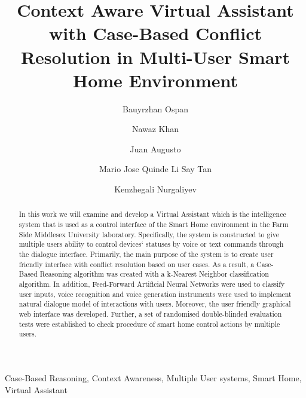 \documentclass{llncs}
\begin{document}
    \title{Context Aware Virtual Assistant with
    Case-Based Conflict Resolution in
    Multi-User Smart Home Environment}
    \author{Bauyrzhan Ospan \and Nawaz Khan  \and Juan Augusto  \and Mario Jose Quinde Li Say Tan  \and Kenzhegali Nurgaliyev }
    \maketitle
    \begin{abstract}
        In this work we will examine and develop a Virtual Assistant which is the intelligence system that is used as a control
        interface of the Smart Home environment in the Farm Side Middlesex University laboratory. Specifically, the system is
        constructed to give multiple users ability to control devices` statuses by voice or text commands through the dialogue
        interface. Primarily, the main purpose of the system is to create user friendly interface with conflict resolution based
        on user cases. As a result, a Case-Based Reasoning algorithm was created with a k-Nearest Neighbor classification algorithm.
        In addition, Feed-Forward Artificial Neural Networks were used to classify user inputs, voice
        recognition and voice generation instruments were used to implement natural dialogue model of interactions with users.
        Moreover, the user friendly graphical web interface was developed. Further, a set of randomised double-blinded
        evaluation tests were established to check procedure of smart home control actions by multiple users.
    \end{abstract}
    \begin{keywords}
        Case-Based Reasoning, Context Awareness, Multiple User systems, Smart Home, Virtual Assistant
    \end{keywords}
\end{document}
